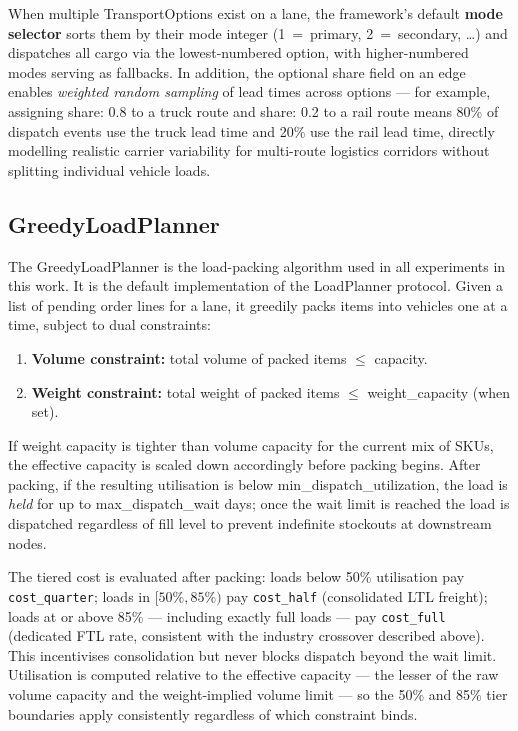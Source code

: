 When multiple TransportOptions exist on a lane, the framework's
default \textbf{mode selector} sorts them by their mode integer
(1~=~primary, 2~=~secondary, \ldots) and dispatches all cargo via the
lowest-numbered option, with higher-numbered modes serving as fallbacks.
In addition, the optional share field on an edge enables
\emph{weighted random sampling} of lead times across options — for example,
assigning share: 0.8 to a truck route and share: 0.2 to
a rail route means 80\% of dispatch events use the truck lead time and 20\%
use the rail lead time, directly modelling realistic carrier variability for
multi-route logistics corridors without splitting individual vehicle loads.

\subsection{GreedyLoadPlanner}

The GreedyLoadPlanner is the load-packing algorithm used in all
experiments in this work.  It is the default implementation of the
LoadPlanner protocol.  Given a list of pending order lines for a
lane, it greedily packs items into vehicles one at a time, subject to dual
constraints:

\begin{enumerate}
  \item \textbf{Volume constraint:} total volume of packed items
        $\leq$ capacity.
  \item \textbf{Weight constraint:} total weight of packed items
        $\leq$ weight\_capacity (when set).
\end{enumerate}

If weight capacity is tighter than volume capacity for the current mix of SKUs,
the effective capacity is scaled down accordingly before packing begins.  After
packing, if the resulting utilisation is below min\_dispatch\_utilization,
the load is \emph{held} for up to max\_dispatch\_wait days; once the
wait limit is reached the load is dispatched regardless of fill level to prevent
indefinite stockouts at downstream nodes.

The tiered cost is evaluated after packing: loads below 50\% utilisation pay
\texttt{cost\_quarter}; loads in $[50\%, 85\%)$ pay \texttt{cost\_half}
(consolidated LTL freight); loads at or above 85\% — including exactly full loads —
pay \texttt{cost\_full} (dedicated FTL rate, consistent with the industry
crossover described above).
This incentivises consolidation but never blocks dispatch beyond the wait limit.
Utilisation is computed relative to the effective capacity — the lesser of the raw volume capacity and the weight-implied volume limit — so the 50\% and 85\% tier boundaries apply consistently regardless of which constraint binds.

